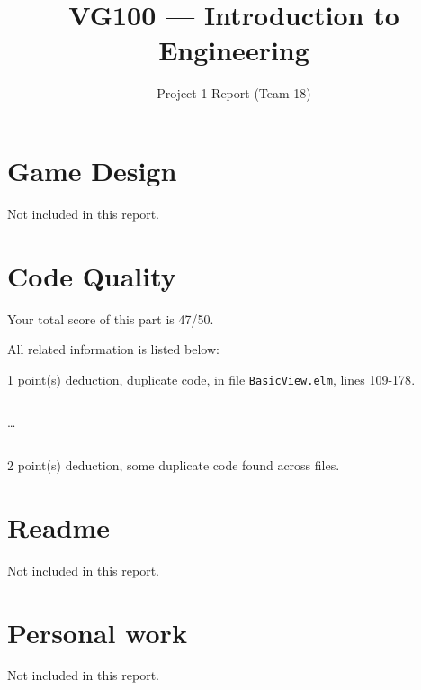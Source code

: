 \documentclass{article}
\title{VG100 --- Introduction to\\ Engineering}
\subtitle{Project 1 Report (Team 18)}
\begin{document}
\maketitle

\section{Game Design}

Not included in this report.

\section{Code Quality}

Your total score of this part is 47/50. \medskip

All related information is listed below: \medskip

1 point(s) {\color{red}deduction}, duplicate code, in file {\color{blue}\texttt{BasicView.elm}}, lines {\color{blue}109-178}.

\inputminted[firstline=109,lastline=118]{elm}{BasicView.elm}

\dots

\inputminted[firstline=169,lastline=178]{elm}{BasicView.elm}

2 point(s) {\color{red}deduction}, some duplicate code found across files.\medskip



\newpage

\section{Readme}

Not included in this report.

\section{Personal work}

Not included in this report.


\newpage
\end{document}
